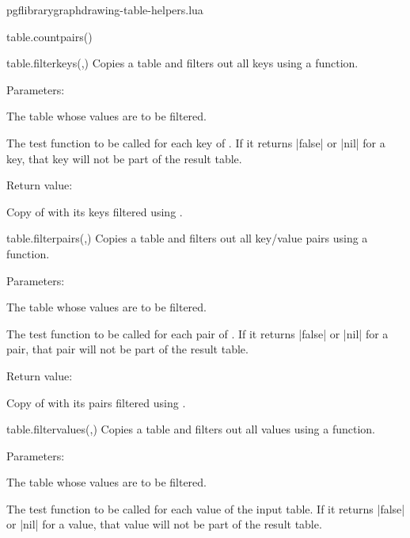 \begin{filedescription}{pgflibrarygraphdrawing-table-helpers.lua}
\begin{luacommand}{{table.count\textunderscore{}pairs}()}
\end{luacommand}
\begin{luacommand}{{table.filter\textunderscore{}keys}(,)}
Copies a table and filters out all keys using a function. 

Parameters:
\begin{parameterdescription}
	\item[\meta{table}] The table whose values are to be filtered.\item[\meta{filter\_func}] The test function to be called for each key of . If it returns |false| or |nil| for a key, that key will not be part of the result table. 
\end{parameterdescription}


Return value:
\begin{parameterdescription} 
  \item[] Copy of  with its keys filtered using . 
\end{parameterdescription}


\end{luacommand}
\begin{luacommand}{{table.filter\textunderscore{}pairs}(,)}
Copies a table and filters out all key/value pairs using a function. 

Parameters:
\begin{parameterdescription}
	\item[\meta{table}] The table whose values are to be filtered.\item[\meta{filter\_func}] The test function to be called for each pair of . If it returns |false| or |nil| for a pair, that pair will not be part of the result table. 
\end{parameterdescription}


Return value:
\begin{parameterdescription} 
  \item[] Copy of  with its pairs filtered using . 
\end{parameterdescription}


\end{luacommand}
\begin{luacommand}{{table.filter\textunderscore{}values}(,)}
Copies a table and filters out all values using a function. 

Parameters:
\begin{parameterdescription}
	\item[\meta{input}] The table whose values are to be filtered.\item[\meta{filter\_func}] The test function to be called for each value of the input table. If it returns |false| or |nil| for a value, that value will not be part of the result table. 
\end{parameterdescription}



\end{luacommand}
\end{filedescription}
